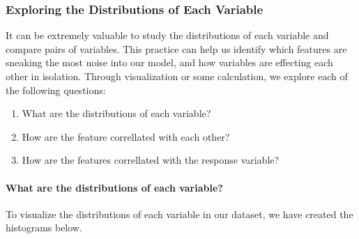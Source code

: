 \documentclass[11pt]{article}
\providecommand{\tightlist}{%
      \setlength{\itemsep}{0pt}\setlength{\parskip}{0pt}}
\begin{document}
    \subsubsection{Exploring the Distributions of Each
Variable}\label{exploring-the-distributions-of-each-variable}

It can be extremely valuable to study the distributions of each variable
and compare pairs of variables. This practice can help us identify which
features are sneaking the most noise into our model, and how variables
are effecting each other in isolation. Through visualization or some
calculation, we explore each of the following questions:

\begin{enumerate}
\def\labelenumi{\arabic{enumi}.}
\tightlist
\item
  What are the distributions of each variable?
\item
  How are the feature correllated with each other?
\item
  How are the features correllated with the response variable?
\end{enumerate}

\paragraph{What are the distributions of each
variable?}\label{what-are-the-distributions-of-each-variable}

To visualize the distributions of each variable in our dataset, we have
created the histograms below.
\end{document}
